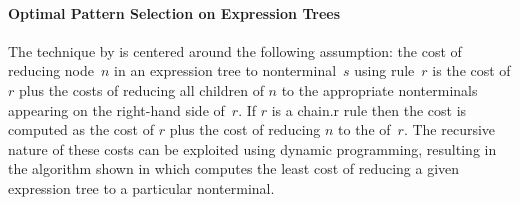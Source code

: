 \paragraph{Optimal Pattern Selection on Expression Trees}

The technique by \citeauthor{AhoEtAl:1989} is centered around the following
assumption: the cost of reducing \gls{node}~$n$ in an \gls{expression tree} to
\gls{nonterminal}~$s$ using \gls{rule}~$r$ is the cost of $r$ plus the costs of
reducing all children of $n$ to the appropriate \glspl{nonterminal} appearing on
the right-hand side of~$r$.
%
If $r$ is a \gls{chain.r} \gls{rule} then the cost is computed as the cost of
$r$ plus the cost of reducing $n$ to the  of~$r$.
%
The recursive nature of these costs can be exploited using dynamic programming,
resulting in the algorithm shown in  which
computes the least cost of reducing a given \gls{expression tree} to a
particular \gls{nonterminal}.

